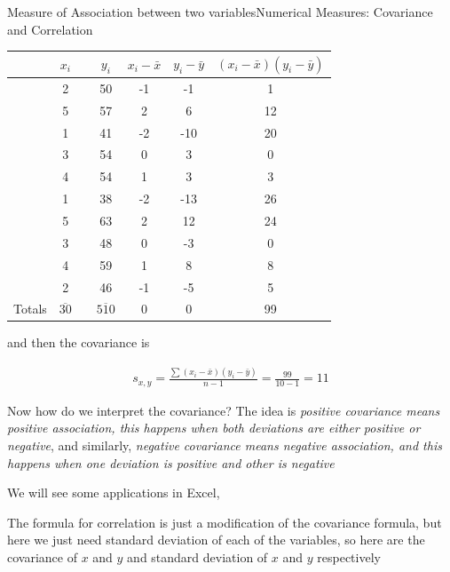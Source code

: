 \documentclass[8pt, usepdftitle=false]{beamer}
\begin{document}
\begin{frame}[allowframebreaks]{Measure of Association between two variables}{Numerical Measures: Covariance and Correlation}
\begin{itemize}
\begin{table}[H]
\begin{tabular}{|ccc|c|c|c|c|}
\hline & $x_i$ & & $y_i$ & $x_i-\bar{x}$ & $y_i-\bar{y}$ & $\left(x_i-\bar{x}\right)\left(y_i-\bar{y}\right)$ \\
\hline & 2 & & 50 & -1 & -1 & 1 \\
\hline & 5 & & 57 & 2 & 6 & 12 \\
\hline & 1 & & 41 & -2 & -10 & 20 \\
\hline & 3 & & 54 & 0 & 3 & 0 \\
\hline & 4 & & 54 & 1 & 3 & 3 \\
\hline & 1 & & 38 & -2 & -13 & 26 \\
\hline & 5 & & 63 & 2 & 12 & 24 \\
\hline & 3 & & 48 & 0 & -3 & 0 \\
\hline & 4 & & 59 & 1 & 8 & 8 \\
\hline & 2 & & 46 & -1 & -5 & 5 \\
\hline Totals & $\overline{30}$ & & $\overline{510}$ & 0 & 0 & 99 \\
\hline
\end{tabular}

\item and then the covariance is 

  \begin{align*}
    s_{x, y} = \frac{\sum\left(x_i-\bar{x}\right)\left(y_i-\bar{y}\right)}{n-1} = \frac{99}{10-1} = 11
  \end{align*}

\item Now how do we interpret the covariance? The idea is \emph{positive covariance means positive association, this happens when both deviations are either positive or negative}, and similarly, \emph{negative covariance means negative association, and this happens when one deviation is positive and other is negative}



    
  \end{table}


  \item We will see some applications in Excel, 


\framebreak

\item The formula for correlation is just a modification of the covariance formula, but here we just need standard deviation of each of the variables, so here are the covariance of $x$ and $y$ and standard deviation of $x$ and $y$ respectively


\end{itemize}
\end{frame}
\end{document}
